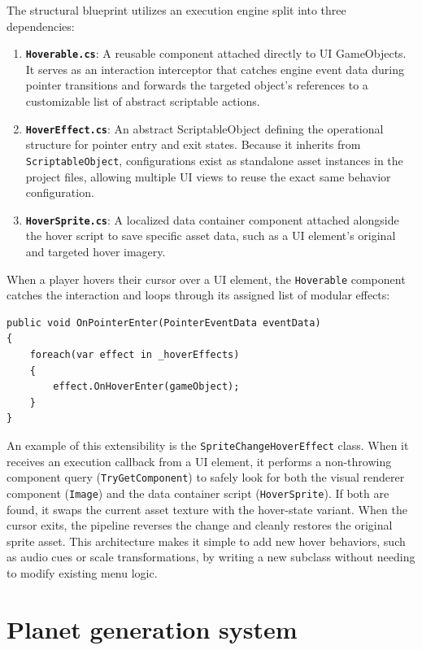 \documentclass[12pt]{report}
\begin{document}
The structural blueprint utilizes an execution engine split into three dependencies:
\begin{enumerate}
    \item \textbf{\texttt{Hoverable.cs}}: A reusable component attached directly to UI GameObjects. It serves as an interaction interceptor that catches engine event data during pointer transitions and forwards the targeted object's references to a customizable list of abstract scriptable actions.
    \item \textbf{\texttt{HoverEffect.cs}}: An abstract ScriptableObject defining the operational structure for pointer entry and exit states. Because it inherits from \texttt{ScriptableObject}, configurations exist as standalone asset instances in the project files, allowing multiple UI views to reuse the exact same behavior configuration.
    \item \textbf{\texttt{HoverSprite.cs}}: A localized data container component attached alongside the hover script to save specific asset data, such as a UI element's original and targeted hover imagery.
\end{enumerate}

When a player hovers their cursor over a UI element, the \texttt{Hoverable} component catches the interaction and loops through its assigned list of modular effects:
\begin{verbatim}
public void OnPointerEnter(PointerEventData eventData)
{
    foreach(var effect in _hoverEffects)
    {
        effect.OnHoverEnter(gameObject);
    }
}
\end{verbatim}

An example of this extensibility is the \texttt{SpriteChangeHoverEffect} class. When it receives an execution callback from a UI element, it performs a non-throwing component query (\texttt{TryGetComponent}) to safely look for both the visual renderer component (\texttt{Image}) and the data container script (\texttt{HoverSprite}). If both are found, it swaps the current asset texture with the hover-state variant. When the cursor exits, the pipeline reverses the change and cleanly restores the original sprite asset. This architecture makes it simple to add new hover behaviors, such as audio cues or scale transformations, by writing a new subclass without needing to modify existing menu logic.

\section{Planet generation system}
\end{document}
